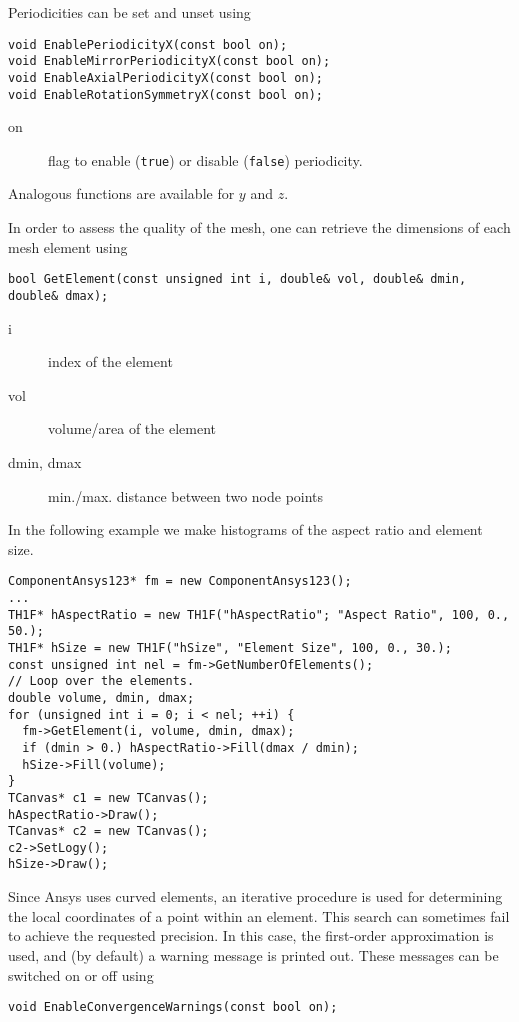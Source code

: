 Periodicities can be set and unset using
\begin{lstlisting}
void EnablePeriodicityX(const bool on);
void EnableMirrorPeriodicityX(const bool on);
void EnableAxialPeriodicityX(const bool on);
void EnableRotationSymmetryX(const bool on);
\end{lstlisting}
\begin{description}
\item[on] flag to enable (\texttt{true}) or disable (\texttt{false}) periodicity. 
\end{description}
Analogous functions are available for \(y\) and \(z\).

In order to assess the quality of the mesh, 
one can retrieve the dimensions of each mesh element using
\begin{lstlisting}
bool GetElement(const unsigned int i, double& vol, double& dmin, double& dmax);
\end{lstlisting}
\begin{description}
\item[i] index of the element
\item[vol] volume/area of the element
\item[dmin, dmax] min./max. distance between two node points
\end{description}

In the following example we make histograms of the aspect ratio and 
element size.
\begin{lstlisting}
ComponentAnsys123* fm = new ComponentAnsys123();
...
TH1F* hAspectRatio = new TH1F("hAspectRatio"; "Aspect Ratio", 100, 0., 50.);
TH1F* hSize = new TH1F("hSize", "Element Size", 100, 0., 30.);
const unsigned int nel = fm->GetNumberOfElements();
// Loop over the elements.
double volume, dmin, dmax;
for (unsigned int i = 0; i < nel; ++i) {
  fm->GetElement(i, volume, dmin, dmax);
  if (dmin > 0.) hAspectRatio->Fill(dmax / dmin);
  hSize->Fill(volume);
}
TCanvas* c1 = new TCanvas();
hAspectRatio->Draw();
TCanvas* c2 = new TCanvas();
c2->SetLogy();
hSize->Draw();
\end{lstlisting}

Since Ansys uses curved elements, an iterative procedure is used for 
determining the local coordinates of a point within an element. 
This search can sometimes fail to achieve the requested precision.
In this case, the first-order approximation is used, and (by default) 
a warning message is printed out. These messages can be switched on or off 
using 
\begin{lstlisting}
void EnableConvergenceWarnings(const bool on);
\end{lstlisting}

